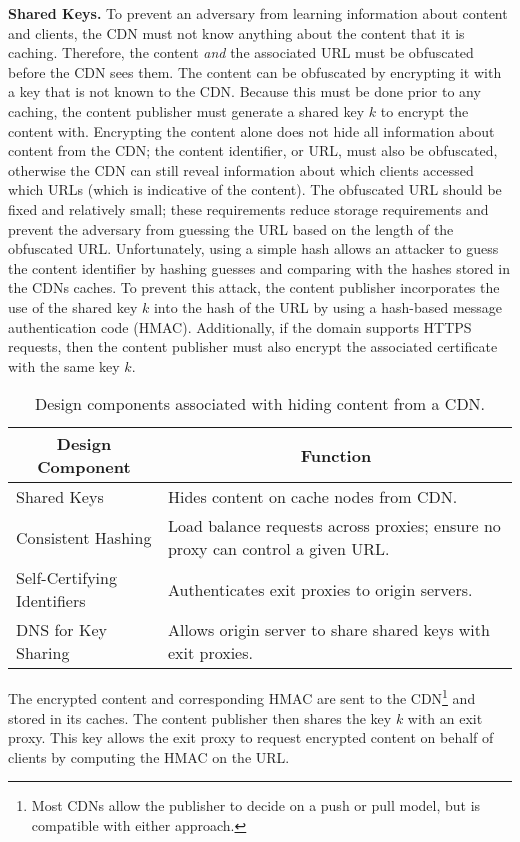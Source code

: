 \textbf{Shared Keys.} 
To prevent an adversary from learning information about content and clients, the CDN must not know anything
about the
content that it is caching.  Therefore, the content {\it and} the associated URL
must be obfuscated
before the CDN sees them.  The content can be obfuscated by encrypting it with a
key that is not
known to the CDN.  Because this must be done prior to any caching, the content publisher must 
generate a shared key $k$ to encrypt the content with. Encrypting the content alone does not 
hide all information about content from the CDN; the content identifier, or URL, must also be obfuscated, otherwise the 
CDN can still reveal information about which clients accessed which URLs (which is indicative 
of the content).  The obfuscated URL should be fixed and relatively
small; 
these requirements reduce storage requirements and prevent the adversary from guessing
the
URL based on the length of the obfuscated URL.  Unfortunately, using a simple hash allows an 
attacker to guess the content identifier by hashing guesses and comparing with 
the hashes stored in the CDNs caches.  To prevent this attack, the content publisher incorporates the use 
of the shared key $k$ into the hash of the URL by using a hash-based message authentication code 
(HMAC).  Additionally, if the domain supports HTTPS requests, then the content publisher must 
also encrypt the associated certificate with the same key $k$.

\begin{table}[t!]
\small
\centering
\begin{tabular}{ l  p{1.9in} } 
 \multicolumn{1}{c}{\bf Design Component} & \multicolumn{1}{c}{\bf Function} \\
\hline \hline
 Shared Keys & {Hides content on cache nodes from CDN.} \\
 Consistent Hashing & {Load balance requests across proxies; ensure no proxy can
 control a given URL.} \\
 Self-Certifying Identifiers & {Authenticates exit proxies to origin servers.} \\
 DNS for Key Sharing & {Allows origin server to share shared keys with exit
 proxies.} \\ \hline
\end{tabular}
\caption{Design components associated with hiding content from a CDN.}
\label{tab:setup}
\end{table}


The encrypted content and corresponding HMAC are sent to the CDN\footnote{Most CDNs
allow the publisher to
decide on a push or pull model, but \system{} is compatible with either approach.}
and stored in
its caches.  The content publisher then shares the key $k$ with an exit proxy. 
This key allows the 
exit proxy to request encrypted content on behalf of clients by computing the HMAC on the URL.  

